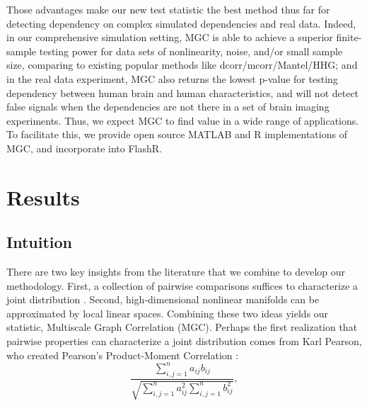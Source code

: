\documentclass[11pt]{article}
\newcommand{\cs}[1]{{\color{blue}{#1}}}
\begin{document}
Those advantages make our new test statistic the best method thus far for detecting dependency on complex simulated dependencies and real data. Indeed, in our comprehensive simulation setting, MGC is able to achieve a superior finite-sample testing power for data sets of nonlinearity, noise, and/or small sample size, comparing to existing popular methods like dcorr/mcorr/Mantel/HHG; and in the real data experiment, MGC also returns the lowest p-value for testing dependency between human brain and human characteristics,  and will not detect false signals when the dependencies are not there in a set of brain imaging experiments. Thus, we expect MGC to find value in a wide range of applications.  To facilitate this, we provide open source MATLAB and R implementations of MGC, and incorporate into FlashR.

\cs{@jv: send data}


\section{Results}

\subsection{Intuition}

There are two key insights from the literature that we combine to develop our methodology.  First, a collection of pairwise comparisons  suffices to characterize a joint distribution \cite{Maa1996}.  Second, high-dimensional nonlinear manifolds can be approximated by local linear spaces.  Combining these two ideas yields our statistic,  Multiscale Graph Correlation (MGC).  Perhaps the first realization that pairwise properties can characterize a joint distribution comes from  Karl Pearson, who created Pearson's Product-Moment Correlation \cite{Pearson1895}:
\begin{equation}
\label{generalCoef}
\frac{\sum_{i,j=1}^n a_{ij} b_{ij}}{\sqrt{\sum_{i,j=1}^n  a_{ij}^{2} \sum_{i,j=1}^n b_{ij}^{2}}}, 
\end{equation}
\end{document}

